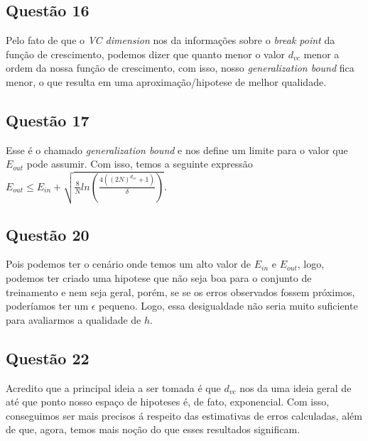 \documentclass[12pt, a4paper]{article}
\begin{document}
\subsection*{Questão 16} {
    Pelo fato de que o \emph{VC dimension} nos da informações sobre o \emph{break point} da função de crescimento, podemos dizer que quanto menor o valor $ d_{vc} $ menor a ordem da nossa função de crescimento, com isso, nosso \emph{generalization bound} fica menor, o que resulta em uma aproximação/hipotese de melhor qualidade.
}

\subsection*{Questão 17} {
    Esse é o chamado \emph{generalization bound} e nos define um limite para o valor que $ E_{out} $ pode assumir. Com isso, temos a seguinte expressão $ E_{out} \le E_{in} + \sqrt{ \frac{8}{N} ln(\frac{ 4((2N)^{d_{vc}}+1) }{\delta})} $.
}



\subsection*{Questão 20} {
    Pois podemos ter o cenário onde temos um alto valor de $ E_{in} $ e $ E_{out} $, logo, podemos ter criado uma hipotese que não seja boa para o conjunto de treinamento e nem seja geral, porém, se se os erros observados fossem próximos, poderíamos ter um $\epsilon$ pequeno. Logo, essa desigualdade não seria muito suficiente para avaliarmos a qualidade de $h$.
}


\subsection*{Questão 22} {
    Acredito que a principal ideia a ser tomada é que $ d_{vc} $ nos da uma ideia geral de até que ponto nosso espaço de hipoteses é, de fato, exponencial. Com isso, conseguimos ser mais precisos á respeito das estimativas de erros calculadas, além de que, agora, temos mais noção do que esses resultados significam.
}
\end{document}
